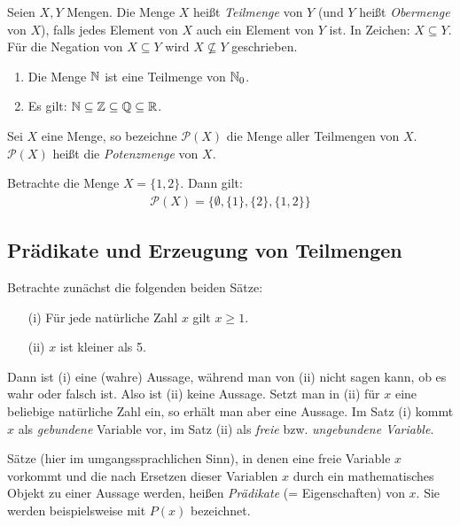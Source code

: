 \begin{frame}
\begin{mydef}
Seien $X,Y$ Mengen.
Die Menge $X$ heißt \textit{Teilmenge} von $Y$ (und $Y$ heißt
\textit{Obermenge} von $X$), falls jedes Element von $X$ auch ein Element
von $Y$ ist.
In Zeichen: $X \subseteq Y$.
Für die Negation von $X \subseteq Y$ wird $X \nsubseteq Y$ geschrieben.
\end{mydef}

\begin{example}
\begin{enumerate}
\item Die Menge $\mathbb{N}$ ist eine Teilmenge von $\mathbb{N}_0$.
\item Es gilt: $\mathbb{N} \subseteq \mathbb{Z} \subseteq \mathbb{Q} \subseteq \mathbb{R}$.
\end{enumerate}
\end{example}
\end{frame}


\begin{frame}
\begin{mydef}
Sei $X$ eine Menge, so bezeichne $\mathcal{P}(X)$ die Menge aller Teilmengen
von $X$.
$\mathcal{P}(X)$ heißt die \textit{Potenzmenge} von $X$.
\end{mydef}

\begin{example}
Betrachte die Menge $X = \{1,2\}$.
Dann gilt:
\begin{align*}
\mathcal{P}(X) = \{\emptyset, \{1\}, \{2\}, \{1,2\}\}
\end{align*}
\end{example}
\end{frame}


\subsection{Prädikate und Erzeugung von Teilmengen}

\begin{frame}
Betrachte zunächst die folgenden beiden Sätze:

\begin{enumerate}
\item[(i)]  Für jede natürliche Zahl $x$ gilt $x \geq 1$.
\item[(ii)] $x$ ist kleiner als 5.
\end{enumerate}

Dann ist (i) eine (wahre) Aussage, während man von (ii) nicht sagen kann,
ob es wahr oder falsch ist.
Also ist (ii) keine Aussage.
Setzt man in (ii) für $x$ eine beliebige natürliche Zahl ein, so erhält man
aber eine Aussage.
Im Satz (i) kommt $x$ als \textit{gebundene} Variable vor, im Satz (ii) als
\textit{freie} bzw. \textit{ungebundene Variable}.


\begin{mydef}
Sätze (hier im umgangssprachlichen Sinn), in denen eine freie Variable $x$
vorkommt und die nach Ersetzen dieser Variablen $x$ durch ein mathematisches
Objekt zu einer Aussage werden, heißen \textit{Prädikate} (= Eigenschaften)
von $x$.
Sie werden beispielsweise mit $P(x)$ bezeichnet.
\end{mydef}
\end{frame}

